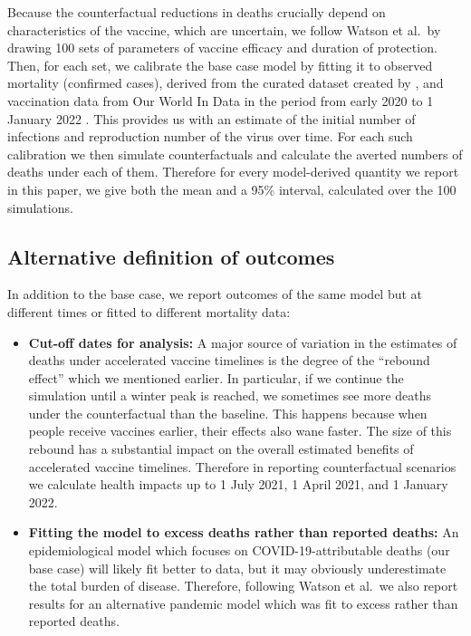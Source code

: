 \documentclass{article}
\begin{document}
Because the counterfactual reductions in deaths crucially depend on characteristics of the vaccine, which are uncertain, we follow Watson et al.~by drawing 100 sets of parameters of vaccine efficacy and duration of protection. Then, for each set, we calibrate the base case model by fitting it to observed mortality (confirmed cases), derived from the curated dataset created by \citet{Dong2020Aninteractive}, and vaccination data from Our World In Data in the period from early 2020 to 1 January 2022 \citep{Mathieu2021Aglobal}. This provides us with an estimate of the initial number of infections and reproduction number of the virus over time. For each such calibration we then simulate counterfactuals and calculate the averted numbers of deaths under each of them. Therefore for every model-derived quantity we report in this paper, we give both the mean and a 95\% interval, calculated over the 100 simulations.

\subsection{Alternative definition of outcomes}\label{alternative-definition-of-outcomes}

In addition to the base case, we report outcomes of the same model but at different times or fitted to different mortality data:

\begin{itemize}
\item
  \textbf{Cut-off dates for analysis:} A major source of variation in the estimates of deaths under accelerated vaccine timelines is the degree of the ``rebound effect'' which we mentioned earlier. In particular, if we continue the simulation until a winter peak is reached, we sometimes see more deaths under the counterfactual than the baseline. This happens because when people receive vaccines earlier, their effects also wane faster. The size of this rebound has a substantial impact on the overall estimated benefits of accelerated vaccine timelines. Therefore in reporting counterfactual scenarios we calculate health impacts up to 1 July 2021, 1 April 2021, and 1 January 2022.
\item
  \textbf{Fitting the model to excess deaths rather than reported deaths: }An epidemiological model which focuses on COVID-19-attributable deaths (our base case) will likely fit better to data, but it may obviously underestimate the total burden of disease. Therefore, following Watson et al.~we also report results for an alternative pandemic model which was fit to excess rather than reported deaths.
\end{itemize}
\end{document}
